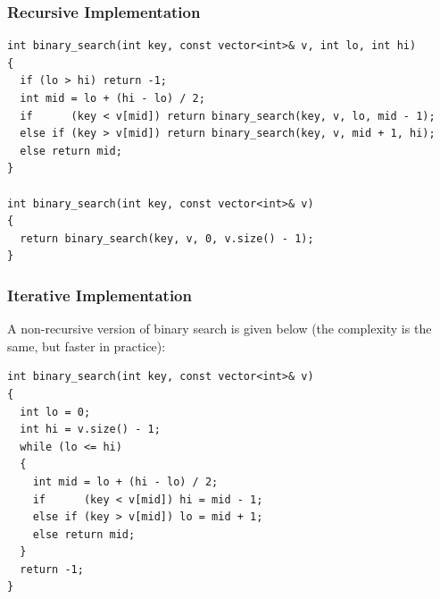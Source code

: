 \documentclass{beamer}
\newcounter{exo}
\newcommand{\exo}{
  \addtocounter{exo}{1}
  Exercice \arabic{exo}
}
\begin{document}
\begin{frame}[containsverbatim]
\frametitle{Recursive Implementation}
\scriptsize
\begin{lstlisting}
int binary_search(int key, const vector<int>& v, int lo, int hi)
{
  if (lo > hi) return -1;
  int mid = lo + (hi - lo) / 2;
  if      (key < v[mid]) return binary_search(key, v, lo, mid - 1);
  else if (key > v[mid]) return binary_search(key, v, mid + 1, hi);
  else return mid;
}

int binary_search(int key, const vector<int>& v)
{
  return binary_search(key, v, 0, v.size() - 1);
}
\end{lstlisting}

\end{frame}

\begin{frame}[containsverbatim]
\frametitle{Iterative Implementation}
\scriptsize
A non-recursive version of binary search is given below (the complexity is the same, but faster in practice):

\begin{lstlisting}[mathescape]
int binary_search(int key, const vector<int>& v)
{
  int lo = 0;
  int hi = v.size() - 1;
  while (lo <= hi)
  {
    int mid = lo + (hi - lo) / 2;
    if      (key < v[mid]) hi = mid - 1;
    else if (key > v[mid]) lo = mid + 1;
    else return mid;
  }
  return -1;
}
\end{lstlisting}

\end{frame}


\ifanswers
\end{document}
